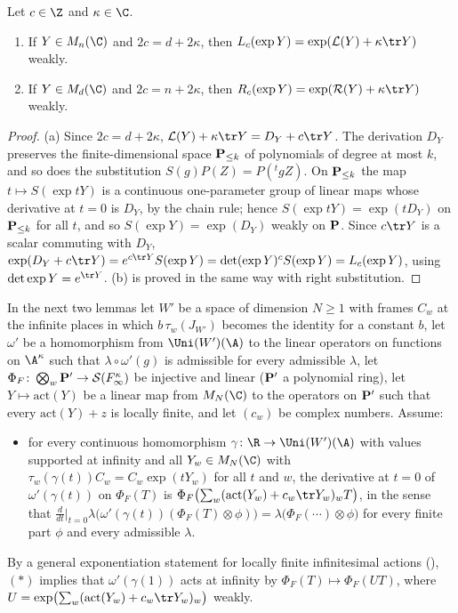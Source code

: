 \begin{lemma}\label{pf:tlift:expfirst}
Let $c\in\Z$ and $\kappa\in\C$.
\begin{enumerate}[label=(\alph*),nosep]
\item If $Y\in M_n(\C)$ and $2c=d+2\kappa$, then $L_c(\exp Y)=\exp(\mathcal L(Y)+\kappa\tr Y)$ weakly.
\item If $Y\in M_d(\C)$ and $2c=n+2\kappa$, then $R_c(\exp Y)=\exp(\mathcal R(Y)+\kappa\tr Y)$ weakly.
\end{enumerate}
\end{lemma}

\begin{proof}
(a) Since $2c=d+2\kappa$, $\mathcal L(Y)+\kappa\tr Y=D_Y+c\tr Y$. The derivation $D_Y$ preserves the finite-dimensional space
$\mathbf{P}_{\le k}$ of polynomials of degree at most $k$, and so does the substitution $S(g)P(Z)=P({}^tgZ)$. On $\mathbf{P}_{\le k}$ the map
$t\mapsto S(\exp tY)$ is a continuous one-parameter group of linear maps whose derivative at $t=0$ is $D_Y$, by the chain rule;
hence $S(\exp tY)=\exp(tD_Y)$ on $\mathbf{P}_{\le k}$ for all $t$, and so $S(\exp Y)=\exp(D_Y)$ weakly on $\mathbf{P}$. Since $c\tr Y$ is a
scalar commuting with $D_Y$, $\exp(D_Y+c\tr Y)=e^{c\tr Y}S(\exp Y)=\det(\exp Y)^cS(\exp Y)=L_c(\exp Y)$, using $\det\exp Y=e^{\tr Y}$.
(b) is proved in the same way with right substitution.
\end{proof}

In the next two lemmas let $W'$ be a space of dimension $N\ge1$ with frames $C_w$ at the infinite places in which
$b\,\tau_w(J_{W'})$ becomes the identity for a constant $b$, let $\omega'$ be a homomorphism from $\Uni(W')(\A)$ to the linear operators on
functions on $\A^\kappa$ such that $\lambda\circ\omega'(g)$ is admissible for every admissible $\lambda$, let
$\Phi_F\colon\bigotimes_w\mathbf{P}'\to\mathcal{S}(F_\infty^\kappa)$ be injective and linear ($\mathbf{P}'$ a polynomial ring), let
$Y\mapsto\mathrm{act}(Y)$ be a linear map from $M_N(\C)$ to the operators on $\mathbf{P}'$ such that every $\mathrm{act}(Y)+z$ is locally finite,
and let $(c_w)$ be complex numbers. Assume:
\begin{itemize}[nosep]
\item[$(\ast)$] for every continuous homomorphism $\gamma\colon\R\to\Uni(W')(\A)$ with values supported at infinity and all
  $Y_w\in M_N(\C)$ with $\tau_w(\gamma(t))C_w=C_w\exp(tY_w)$ for all $t$ and $w$, the derivative at $t=0$ of $\omega'(\gamma(t))$ on
  $\Phi_F(T)$ is $\Phi_F\bigl(\sum_w(\mathrm{act}(Y_w)+c_w\tr Y_w)_wT\bigr)$, in the sense that
  $\frac d{dt}\big|_{t=0}\lambda\bigl(\omega'(\gamma(t))(\Phi_F(T)\otimes\phi)\bigr)=\lambda\bigl(\Phi_F(\cdots)\otimes\phi\bigr)$ for every finite
  part $\phi$ and every admissible $\lambda$.
\end{itemize}
By a general exponentiation statement for locally finite infinitesimal actions
(), $(\ast)$ implies that $\omega'(\gamma(1))$ acts at infinity by
$\Phi_F(T)\mapsto\Phi_F(UT)$, where $U=\exp\bigl(\sum_w(\mathrm{act}(Y_w)+c_w\tr Y_w)_w\bigr)$ weakly.

